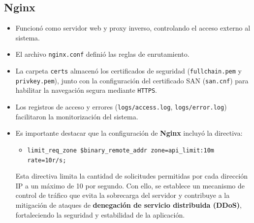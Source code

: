 \documentclass[letter,oneside,12pt,spanish]{report}
\begin{document}
\subsection{Nginx}
\begin{itemize}
    \item Funcionó como servidor web y proxy inverso, controlando el acceso externo al sistema.
    \item El archivo \texttt{nginx.conf} definió las reglas de enrutamiento.
    \item La carpeta \texttt{certs} almacenó los certificados de seguridad (\texttt{fullchain.pem} y \texttt{privkey.pem}), junto con la configuración del certificado SAN (\texttt{san.cnf}) para habilitar la navegación segura mediante \texttt{HTTPS}.
    \item Los registros de acceso y errores (\texttt{logs/access.log}, \texttt{logs/error.log}) facilitaron la monitorización del sistema.
	\item Es importante destacar que la configuración de \textbf{Nginx} incluyó la directiva:
    
    \begin{itemize}
        \item \texttt{limit\_req\_zone \$binary\_remote\_addr zone=api\_limit:10m rate=10r/s;}
    \end{itemize}
    
    Esta directiva limita la cantidad de solicitudes permitidas por cada dirección IP a un máximo de 10 por segundo. Con ello, se establece un mecanismo de control de tráfico que evita la sobrecarga del servidor y contribuye a la mitigación de ataques de \textbf{denegación de servicio distribuida (DDoS)}, fortaleciendo la seguridad y estabilidad de la aplicación.
\end{itemize}
\end{document}
